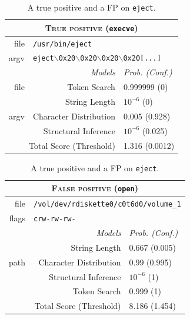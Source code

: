 \begin{table}[tb]
  \centering
  \begin{tabular}{rrl}
    \toprule
    \multicolumn{3}{c}{\textsc{True positive} (\texttt{execve})}\\
    \midrule
    file & \multicolumn{2}{l}{\texttt{/usr/bin/eject}}\\
    argv & \multicolumn{2}{l}{\texttt{eject$\backslash$0x20$\backslash$0x20$\backslash$0x20$\backslash$0x20[...]}}\\
    \cmidrule{2-3}
    & \emph{Models} & \emph{Prob. (Conf.)}\\
    \cmidrule{2-3}
    file & Token Search & 0.999999 (0)\\
    & String Length & $10^{-6}$ (0)\\
    argv & Character Distribution& 0.005 (0.928)\\
    & Structural Inference & $10^{-6}$ (0.025)\\
    \midrule
    \multicolumn{2}{r}{Total Score (Threshold)} & 1.316 (0.0012)\\
    \bottomrule
  \end{tabular}

  \vspace*{5mm}

  \begin{tabular}{rrl}
    \toprule
    \multicolumn{3}{c}{\textsc{False positive} (\texttt{open})}\\
    \midrule
    file & \multicolumn{2}{l}{\texttt{/vol/dev/rdiskette0/c0t6d0/volume\_1}}\\
    flags & \multicolumn{2}{l}{\texttt{crw-rw-rw-}}\\
    \cmidrule{2-3}
    & \emph{Models} & \emph{Prob. (Conf.)}\\
    \cmidrule{2-3}
    & String Length & 0.667 (0.005)\\
    path & Character Distribution& 0.99 (0.995)\\
    & Structural Inference & $10^{-6}$ (1)\\
    & Token Search & 0.999 (1)\\
    \midrule
    \multicolumn{2}{r}{Total Score (Threshold)} & 8.186 (1.454)\\
    \bottomrule
  \end{tabular}

  \caption{A true positive and a \ac{FP} on \texttt{eject}.}
  \label{tab:eject-exec}
\end{table}


